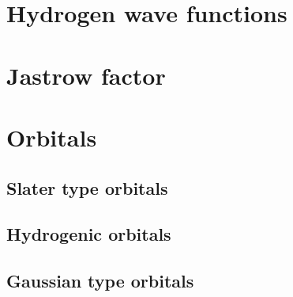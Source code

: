 \documentclass[../../master.tex]{subfiles}
\begin{document}
\section{Hydrogen wave functions}



\section{Jastrow factor}

\section{Orbitals}
\subsection{Slater type orbitals}
\subsection{Hydrogenic orbitals}
\subsection{Gaussian type orbitals}
\end{document}
